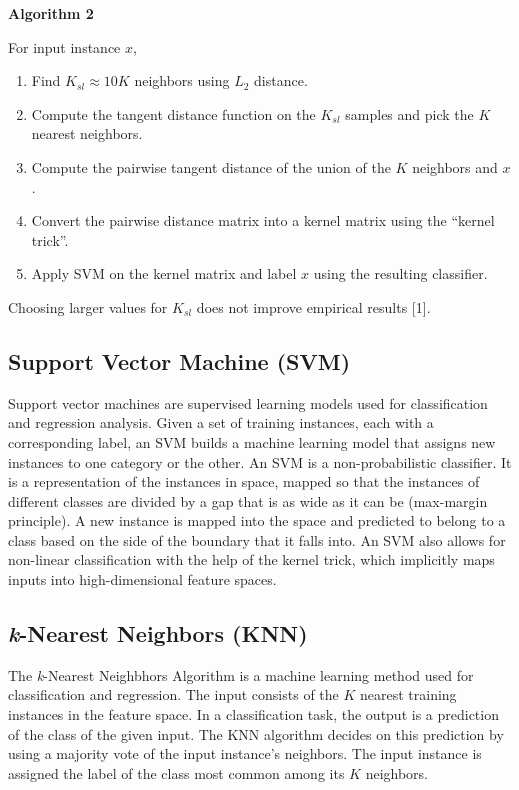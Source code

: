 \documentclass[11pt,letterpaper]{article}
\begin{document}
\textbf{Algorithm 2}

For input instance $x$,
\begin{enumerate}[(1)]
\item Find $K_{sl} \approx 10K$ neighbors using $L_2$ distance.
\item Compute the tangent distance function on the $K_{sl}$ samples and pick the $K$ nearest neighbors.
\item Compute the pairwise tangent distance of the union of the $K$ neighbors and $x$.
\item Convert the pairwise distance matrix into a kernel matrix using the ``kernel trick''.
\item Apply SVM on the kernel matrix and label $x$ using the resulting classifier.
\end{enumerate}

Choosing larger values for $K_{sl}$ does not improve empirical results [1].

\subsection{Support Vector Machine (SVM)}

Support vector machines are supervised learning models used for classification and regression analysis. Given a set of training instances, each with a corresponding label, an SVM builds a machine learning model that assigns new instances to one category or the other. An SVM is a non-probabilistic classifier. It is a representation of the instances in space, mapped so that the instances of different classes are divided by a gap that is as wide as it can be (max-margin principle). A new instance is mapped into the space and predicted to belong to a class based on the side of the boundary that it falls into. An SVM also allows for non-linear classification with the help of the kernel trick, which implicitly maps inputs into high-dimensional feature spaces.

\subsection{\textit{k}-Nearest Neighbors (KNN)}

The \textit{k}-Nearest Neighbhors Algorithm is a machine learning method used for classification and regression. The input consists of the $K$ nearest training instances in the feature space. In a classification task, the output is a prediction of the class of the given input. The KNN algorithm decides on this prediction by using a majority vote of the input instance's neighbors. The input instance is assigned the label of the class most common among its $K$ neighbors.
\end{document}
